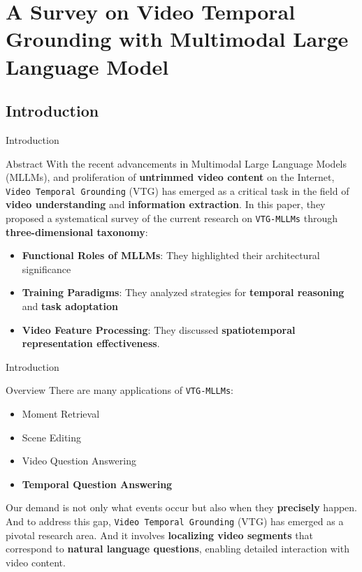 \section{A Survey on Video Temporal Grounding with Multimodal Large Language Model}

\subsection{Introduction}
\begin{frame}{Introduction}
    \begin{block}{Abstract}
        With the recent advancements in Multimodal Large Language Models (MLLMs), and proliferation of \textbf{untrimmed video content} on the Internet, \texttt{Video Temporal Grounding} (VTG)
        has emerged as a critical task in the field of \textbf{video understanding} and \textbf{information extraction}.  In this paper, they proposed
        a systematical survey of the current research on \texttt{VTG-MLLMs} through \textbf{three-dimensional taxonomy}:

        \begin{itemize}
            \item \textbf{Functional Roles of MLLMs}: They highlighted their architectural significance
            \item \textbf{Training Paradigms}: They analyzed strategies for \textbf{temporal reasoning} and \textbf{task adoptation}
            \item \textbf{Video Feature Processing}: They discussed \textbf{spatiotemporal representation effectiveness}.
        \end{itemize}
    \end{block}
\end{frame}

\begin{frame}{Introduction}
    \begin{block}{Overview}
        There are many applications of \texttt{VTG-MLLMs}:
        \begin{itemize}
            \item Moment Retrieval
            \item Scene Editing
            \item Video Question Answering
            \item \textbf{Temporal Question Answering}
        \end{itemize}
        Our demand is not only what events occur but also when they \textbf{precisely} happen. And to address this gap, \texttt{Video Temporal Grounding} (VTG) has emerged as a pivotal research area. And it involves \textbf{localizing video segments} that correspond to \textbf{natural language questions}, enabling detailed interaction with video content.
    \end{block}
\end{frame}


